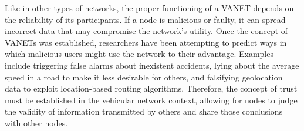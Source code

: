 

Like in other types of networks, the proper functioning of a VANET depends on the reliability of its participants.
If a node is malicious or faulty, it can spread incorrect data that may compromise the network's utility.
Once the concept of VANETs was established, researchers have been attempting to predict ways in which malicious users might use the network to their advantage.
Examples include triggering false alarms about inexistent accidents, lying about the average speed in a road to make it less desirable for others, and falsifying geolocation data to exploit location-based routing algorithms.
Therefore, the concept of trust must be established in the vehicular network context, allowing for nodes to judge the validity of information transmitted by others and share those conclusions with other nodes.

